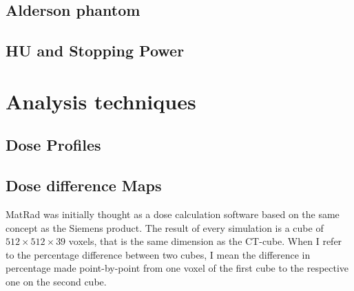 \documentclass[12pt, a4paper, twoside]{book}
\begin{document}
\subsection{Alderson phantom}
\subsection{HU and Stopping Power}

\section{Analysis techniques}
\subsection{Dose Profiles}
\subsection{Dose difference Maps}
MatRad was initially thought as a dose calculation software based on the same concept as the Siemens product. The result of every simulation is a cube of $512\times512\times39$ voxels, that is the same dimension as the CT-cube. When I refer to the percentage difference between two cubes, I mean the difference in percentage made point-by-point from one voxel of the first cube to the respective one on the second cube. %
\end{document}
